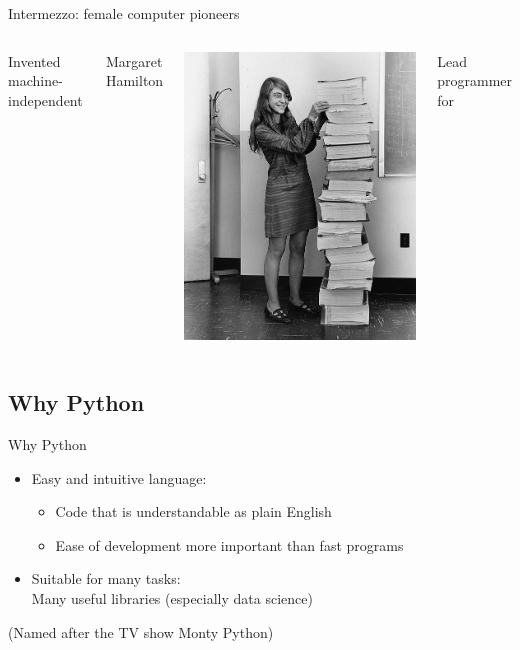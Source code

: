 \documentclass[aspectratio=169,usenames,dvipsnames]{beamer}
\begin{document}
\begin{frame}{Intermezzo: female computer pioneers}
\begin{columns}[T]
		Invented machine-independent 

		\pause
		Margaret Hamilton %

		\vspace{1ex}
		\includegraphics[width=0.9\linewidth]{fig/margarethamilton}

		Lead programmer for 
	\end{columns}
\end{frame}

\subsection{Why Python}
\frame{\tableofcontents[currentsubsection]}
\begin{frame}{Why Python}
    \begin{itemize}
        \item Easy and intuitive language:
            \begin{itemize}
                \item Code that is understandable as plain English
                \item Ease of development more important than fast programs
            \end{itemize}
        \item Suitable for many tasks:\\
            Many useful libraries (especially data science)
    \end{itemize}

    (Named after the TV show Monty Python)
\end{frame}
\end{document}

